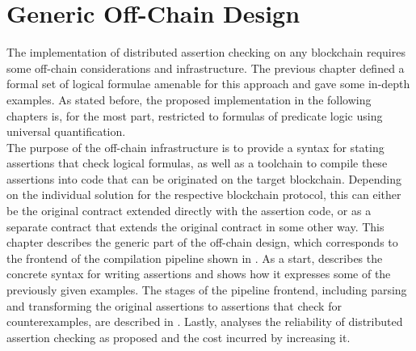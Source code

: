 

\chapter{Generic Off-Chain Design}\label{chap:offline}
The implementation of distributed assertion checking on any blockchain requires some off-chain considerations and infrastructure. The previous chapter defined a formal set of logical formulae amenable for this approach and gave some in-depth examples. As stated before, the proposed implementation in the following chapters is, for the most part, restricted to formulas of predicate logic using universal quantification.\\
The purpose of the off-chain infrastructure is to provide a syntax for stating assertions that check logical formulas, as well as a toolchain to compile these assertions into code that can be originated on the target blockchain. Depending on the individual solution for the respective blockchain protocol, this can either be the original contract extended directly with the assertion code, or as a separate contract that extends the original contract in some other way. This chapter describes the generic part of the off-chain design, which corresponds to the frontend of the compilation pipeline shown in . As a start,  describes the concrete syntax for writing assertions and shows how it expresses some of the previously given examples. The stages of the pipeline frontend, including parsing and transforming the original assertions to assertions that check for counterexamples, are described in . Lastly,  analyses the reliability of distributed assertion checking as proposed and the cost incurred by increasing it.

